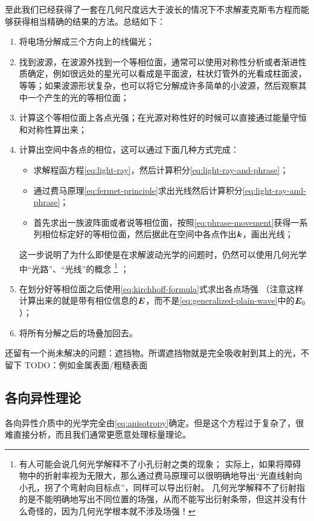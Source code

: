 \documentclass[UTF8, a4paper]{ctexart}
\begin{document}
至此我们已经获得了一套在几何尺度远大于波长的情况下不求解麦克斯韦方程而能够获得相当精确的结果的方法。总结如下：
\begin{enumerate}
    \item 将电场分解成三个方向上的线偏光；
    \item 找到波源，在波源外找到一个等相位面，通常可以使用对称性分析或者渐进性质确定，例如很远处的星光可以看成是平面波，柱状灯管外的光看成柱面波，等等；如果波源形状复杂，也可以将它分解成许多简单的小波源，然后观察其中一个产生的光的等相位面；
    \item 计算这个等相位面上各点光强；在光源对称性好的时候可以直接通过能量守恒和对称性算出来；
    \item 计算出空间中各点的相位，这可以通过下面几种方式完成：
    \begin{itemize}
        \item 求解程函方程\eqref{eq:light-ray}，然后计算积分\eqref{eq:light-ray-and-phrase}；
        \item 通过费马原理\eqref{eq:fermet-principle}求出光线然后计算积分\eqref{eq:light-ray-and-phrase}；
        \item 首先求出一族波阵面或者说等相位面，按照\eqref{eq:phrase-movement}获得一系列相位标定好的等相位面，然后据此在空间中各点作出$\vb*{k}$，画出光线；
    \end{itemize}
    这一步说明了为什么即使是在求解波动光学的问题时，仍然可以使用几何光学中“光路”、“光线”的概念%
    \footnote{有人可能会说几何光学解释不了小孔衍射之类的现象；
    实际上，如果将障碍物中的折射率视为无限大，那么通过费马原理可以很明确地导出“光直线射向小孔，拐了个弯射向目标点”，同样可以导出衍射。
    几何光学解释不了衍射指的是不能明确地写出不同位置的场强，从而不能写出衍射条带，但这并没有什么奇怪的，因为几何光学根本就不涉及场强！}
    ；
    \item 在划分好等相位面之后使用\eqref{eq:kirchhoff-formula}式求出各点场强
    （注意这样计算出来的就是带有相位信息的$\vb*{E}$，而不是\eqref{eq:generalized-plain-wave}中的$\vb*{E}_0$）；
    \item 将所有分解之后的场叠加回去。
\end{enumerate}

还留有一个尚未解决的问题：遮挡物。所谓遮挡物就是完全吸收射到其上的光，不留下
TODO：例如金属表面/粗糙表面

\subsection{各向异性理论}

各向异性介质中的光学完全由\eqref{eq:anisotropy}确定。但是这个方程过于复杂了，很难直接分析，而且我们通常更愿意处理标量理论。
\end{document}
